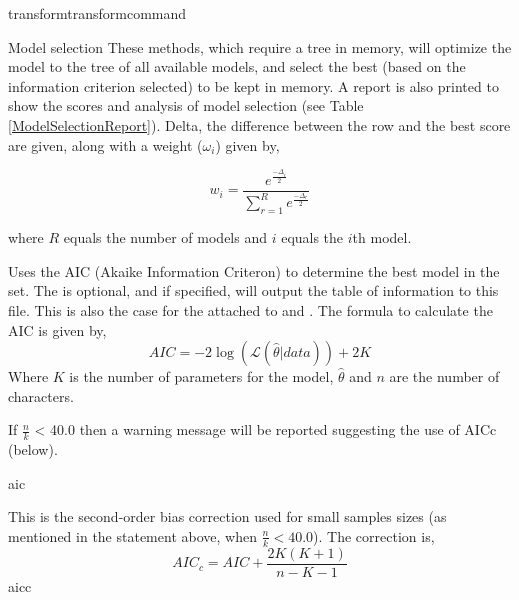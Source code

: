 \begin{command}{transform}{transformcommand}
\begin{arguments}
\begin {argumentgroup}{Model selection}
            These methods, which require a tree in memory, will optimize the model
            to the tree of all available models, and select the best (based
            on the information criterion selected) to be kept in memory. A
            report is also printed to show the scores and analysis of model
            selection (see Table \ref {ModelSelectionReport}).  Delta, the 
            difference between the row and the best score are given, along
            with a weight (${\omega_i}$) given by,

            \begin{equation*}
                w_{i} = \frac{e^{\frac{-\Delta_i}{2}}}
                             {\sum^R_{r=1} e^{\frac{-\Delta_r}{2}}}
            \end{equation*}
            
            where $R$ equals the number of models and  $i$ equals the $i$th model. 
            
                {Uses the AIC (Akaike Information Criteron) to determine
                the best model in the set. The \poystring is optional, and if specified, 
                \poy will output the table of information  to this file.  This is also the case
                for the \poystring attached to  and .
                The formula to calculate the AIC is given by,
                \begin{equation*}
                    AIC = - 2 \log(\mathcal{L}(\hat{\theta}|data)) + 2  K
                \end{equation*}
                Where $K$ is the number of parameters for the model,
                $\hat{\theta}$ and $n$ are the number of characters. 
                \begin{statement}
                    If $\frac{n}{k}$ < 40.0 then a warning message will be
                    reported suggesting the use of AICc (below).
                \end{statement} }
                {aic}

                {This is the second-order bias correction used for small
                samples sizes (as mentioned in the statement above, when
                $\frac{n}{k} < 40.0$). The correction is,
                \begin{equation*}
                    AIC_c = AIC + \frac{2K(K+1)} {n-K-1}
                \end{equation*}}
                {aicc}
            

\end{argumentgroup}
\end{arguments}
\end{command}
